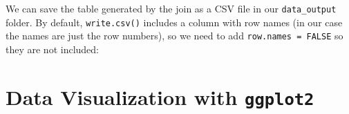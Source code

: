 \documentclass[]{book}
\newenvironment{Shaded}{\begin{snugshade}}{\end{snugshade}}
\newcommand{\DataTypeTok}[1]{\textcolor[rgb]{0.13,0.29,0.53}{#1}}
\newcommand{\DecValTok}[1]{\textcolor[rgb]{0.00,0.00,0.81}{#1}}
\newcommand{\KeywordTok}[1]{\textcolor[rgb]{0.13,0.29,0.53}{\textbf{#1}}}
\newcommand{\NormalTok}[1]{#1}
\newcommand{\OperatorTok}[1]{\textcolor[rgb]{0.81,0.36,0.00}{\textbf{#1}}}
\newcommand{\OtherTok}[1]{\textcolor[rgb]{0.56,0.35,0.01}{#1}}
\newcommand{\StringTok}[1]{\textcolor[rgb]{0.31,0.60,0.02}{#1}}
\begin{document}
We can save the table generated by the join as a CSV file in our \texttt{data\_output}
folder. By default, \texttt{write.csv()} includes a column with row names (in our case
the names are just the row numbers), so we need to add \texttt{row.names\ =\ FALSE} so
they are not included:

\begin{Shaded}
\end{Shaded}

\hypertarget{data-visualization-with-ggplot2}{%
\chapter{\texorpdfstring{Data Visualization with \texttt{ggplot2}}{Data Visualization with ggplot2}}\label{data-visualization-with-ggplot2}}
\end{document}
